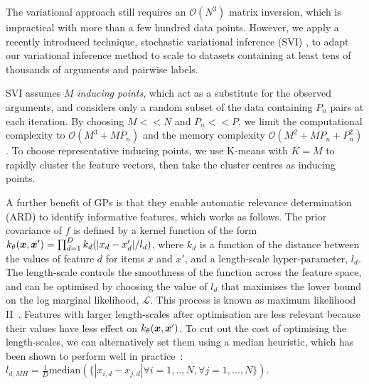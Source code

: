 The variational approach still requires an $\mathcal{O}(N^3)$ matrix inversion,
which is impractical with more than a few hundred data points. 
However, we apply a recently introduced technique, stochastic variational inference (SVI) 
\cite{hoffman2013stochastic,hensman_scalable_2015},
 to adapt our variational inference method
to scale to datasets containing at least tens of thousands of 
arguments and pairwise labels.

SVI assumes $M$ \emph{inducing points},
which act as a substitute for the observed arguments,
and considers only a random subset of the data containing $P_n$ pairs at each iteration. 
By choosing $M << N$ and $P_n << P$, we limit the computational
complexity to $\mathcal{O}(M^3 + MP_n)$ and the 
memory complexity $\mathcal{O}(M^2 + MP_n + P_n^2)$.
To choose representative inducing points, 
we use K-means with $K=M$ to rapidly cluster the feature vectors, 
then take the cluster centres as inducing points.

A further benefit of GPs is that they enable automatic relevance determination (ARD)
to identify informative features, which works as follows.
The prior covariance of $f$ is defined by a kernel function of the form 
$k_{\theta}(\boldsymbol x, \boldsymbol x') = \prod_{d=1}^D k_d(|x_d - x_d'| / l_d)$, 
where $k_d$ is a function of the distance between the values of feature $d$ 
for items $x$ and $x'$, and a length-scale hyper-parameter, $l_d$.
The length-scale controls the smoothness of the function across the feature space,
and can be optimised by choosing the value of $l_d$ that maximises the lower bound on 
the log marginal likelihood, $\mathcal{L}$. 
This process is known as maximum likelihood II~\cite{rasmussen_gaussian_2006}.
Features with larger length-scales after optimisation are less relevant because their values
have less effect on $k_{\theta}(\boldsymbol x, \boldsymbol x') $.
To cut out the cost of optimising the length-scales, we can alternatively set them using a median heuristic,
which has been shown to perform well in practice~\cite{gretton2012optimal}: 
$ l_{d,MH} = \frac{1}{D} \mathrm{median}( \{ |x_{i,d} - x_{j,d}| \forall i=1,..,N, \forall j=1,...,N\} ) $.
